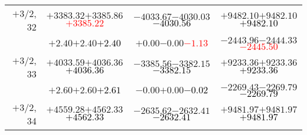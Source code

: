 \documentclass[compress]{beamer}
\begin{document}
\begin{frame}
{\begin{tabular}{r | c | c | c}
$+$3/2, 32 & $+3383.32$\hspace{0.1 cm}$+3385.86$\hspace{0.1 cm}\textcolor{red}{$+3385.22$} & $-4033.67$\hspace{0.1 cm}$-4030.03$\hspace{0.1 cm}\textcolor{black}{$-4030.56$} & $+9482.10$\hspace{0.1 cm}$+9482.10$\hspace{0.1 cm}\textcolor{black}{$+9482.10$} \\
           & $+2.40$\hspace{0.1 cm}$+2.40$\hspace{0.1 cm}\textcolor{black}{$+2.40$} & $+0.00$\hspace{0.1 cm}$-0.00$\hspace{0.1 cm}\textcolor{red}{$-1.13$} & $-2443.96$\hspace{0.1 cm}$-2444.33$\hspace{0.1 cm}\textcolor{red}{$-2445.50$} \\
$+$3/2, 33 & $+4033.59$\hspace{0.1 cm}$+4036.36$\hspace{0.1 cm}\textcolor{black}{$+4036.36$} & $-3385.56$\hspace{0.1 cm}$-3382.15$\hspace{0.1 cm}\textcolor{black}{$-3382.15$} & $+9233.36$\hspace{0.1 cm}$+9233.36$\hspace{0.1 cm}\textcolor{black}{$+9233.36$} \\
           & $+2.60$\hspace{0.1 cm}$+2.60$\hspace{0.1 cm}\textcolor{black}{$+2.61$} & $-0.00$\hspace{0.1 cm}$+0.00$\hspace{0.1 cm}\textcolor{black}{$-0.02$} & $-2269.43$\hspace{0.1 cm}$-2269.79$\hspace{0.1 cm}\textcolor{black}{$-2269.79$} \\
$+$3/2, 34 & $+4559.28$\hspace{0.1 cm}$+4562.33$\hspace{0.1 cm}\textcolor{black}{$+4562.33$} & $-2635.62$\hspace{0.1 cm}$-2632.41$\hspace{0.1 cm}\textcolor{black}{$-2632.41$} & $+9481.97$\hspace{0.1 cm}$+9481.97$\hspace{0.1 cm}\textcolor{black}{$+9481.97$} \\

\end{tabular}}
\end{frame}
\end{document}
